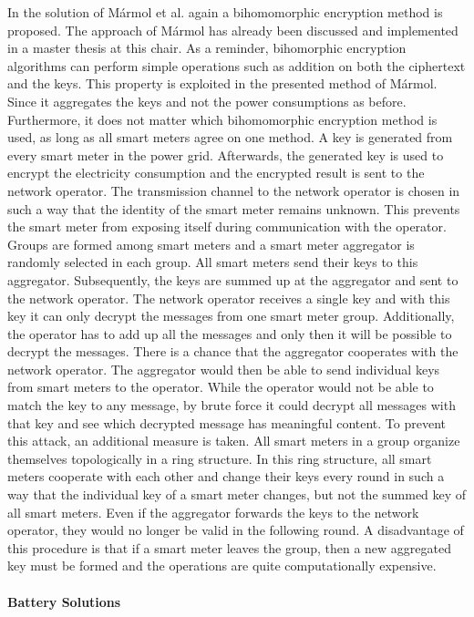 In the solution of Mármol et al. \cite{marmol2012not} again a bihomomorphic encryption method is proposed. The approach of Mármol has already been discussed and implemented in a master thesis at this chair\cite{Anna}. As a reminder, bihomorphic encryption algorithms can perform simple operations such as addition on both the ciphertext and the keys. This property is exploited in the presented method of Mármol. Since it aggregates the keys and not the power consumptions as before. Furthermore, it does not matter which bihomomorphic encryption method is used, as long as all smart meters agree on one method. A key is generated from every smart meter in the power grid. Afterwards, the generated key is used to encrypt the electricity consumption and the encrypted result is sent to the network operator. The transmission channel to the network operator is chosen in such a way that the identity of the smart meter remains unknown. This prevents the smart meter from exposing itself during communication with the operator. Groups are formed among smart meters and a smart meter aggregator is randomly selected in each group. All smart meters send their keys to this aggregator. Subsequently, the keys are summed up at the aggregator and sent to the network operator. The network operator receives a single key and with this key it can only decrypt the messages from one smart meter group. Additionally, the operator has to add up all the messages and only then it will be possible to decrypt the messages. There is a chance that the aggregator cooperates with the network operator. The aggregator would then be able to send individual keys from smart meters to the operator. While the operator would not be able to match the key to any message, by brute force it could decrypt all messages with that key and see which decrypted message has meaningful content. To prevent this attack, an additional measure is taken. All smart meters in a group organize themselves topologically in a ring structure. In this ring structure, all smart meters cooperate with each other and change their keys every round in such a way that the individual key of a smart meter changes, but not the summed key of all smart meters. Even if the aggregator forwards the keys to the network operator, they would no longer be valid in the following round. A disadvantage of this procedure is that if a smart meter leaves the group, then a new aggregated key must be formed and the operations are quite computationally expensive.\\
\\
\textbf{Battery Solutions}
